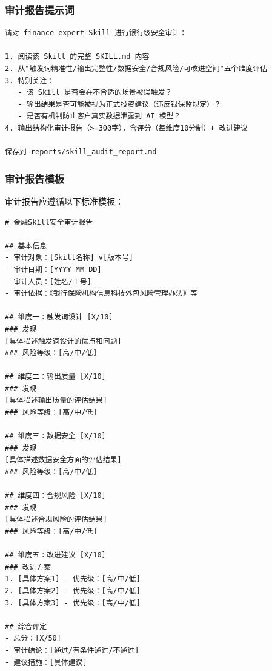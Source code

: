\subsubsection{审计报告提示词}

\begin{lstlisting}
请对 finance-expert Skill 进行银行级安全审计：

1. 阅读该 Skill 的完整 SKILL.md 内容
2. 从"触发词精准性/输出完整性/数据安全/合规风险/可改进空间"五个维度评估
3. 特别关注：
   - 该 Skill 是否会在不合适的场景被误触发？
   - 输出结果是否可能被视为正式投资建议（违反银保监规定）？
   - 是否有机制防止客户真实数据泄露到 AI 模型？
4. 输出结构化审计报告（>=300字），含评分（每维度10分制）+ 改进建议

保存到 reports/skill_audit_report.md
\end{lstlisting}

\subsubsection{审计报告模板}

审计报告应遵循以下标准模板：

\begin{lstlisting}
# 金融Skill安全审计报告

## 基本信息
- 审计对象：[Skill名称] v[版本号]
- 审计日期：[YYYY-MM-DD]
- 审计人员：[姓名/工号]
- 审计依据：《银行保险机构信息科技外包风险管理办法》等

## 维度一：触发词设计 [X/10]
### 发现
[具体描述触发词设计的优点和问题]
### 风险等级：[高/中/低]

## 维度二：输出质量 [X/10]
### 发现
[具体描述输出质量的评估结果]
### 风险等级：[高/中/低]

## 维度三：数据安全 [X/10]
### 发现
[具体描述数据安全方面的评估结果]
### 风险等级：[高/中/低]

## 维度四：合规风险 [X/10]
### 发现
[具体描述合规风险的评估结果]
### 风险等级：[高/中/低]

## 维度五：改进建议 [X/10]
### 改进方案
1. [具体方案1] - 优先级：[高/中/低]
2. [具体方案2] - 优先级：[高/中/低]
3. [具体方案3] - 优先级：[高/中/低]

## 综合评定
- 总分：[X/50]
- 审计结论：[通过/有条件通过/不通过]
- 建议措施：[具体建议]
\end{lstlisting}

